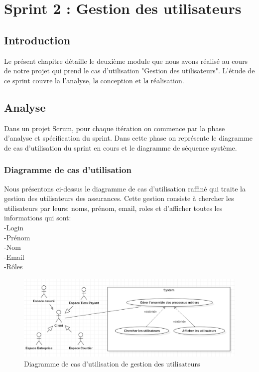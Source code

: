 \chapter{Sprint 2 : Gestion des utilisateurs }

\section*{Introduction}
Le présent chapitre détaille le deuxième module que nous avons réalisé au cours de notre projet
qui prend le cas d’utilisation "Gestion des utilisateurs". L’étude de ce sprint couvre la l’analyse, lа conception et lа réalisation.

\section{Analyse}
Dans un projet Scrum, pour chaque itération on commence par la phase d’analyse et spécification du sprint. Dans cette phase on représente le diagramme de cas d’utilisation du sprint en cours et le diagramme de séquence système.

\subsection{Diagramme de cas d’utilisation}
Nous présentons ci-dessus le diagramme de cas d’utilisation raffiné qui traite la gestion des utilisateurs des assurances.
Cette gestion consiste à chercher les utilisateurs par leurs:  noms, prénom, email, roles et d'afficher toutes les informations qui sont:\\
-Login\\
-Prénom\\
-Nom\\
-Email\\
-Rôles\\


\begin{figure}[H]
\centering
\includegraphics[width=1\columnwidth]{images/useu.PNG}
\caption{Diagramme de cas d'utilisation de gestion des utilisateurs}
\label{fig:Diagramme de cas d'utilisation sprint 1}
\end{figure}

